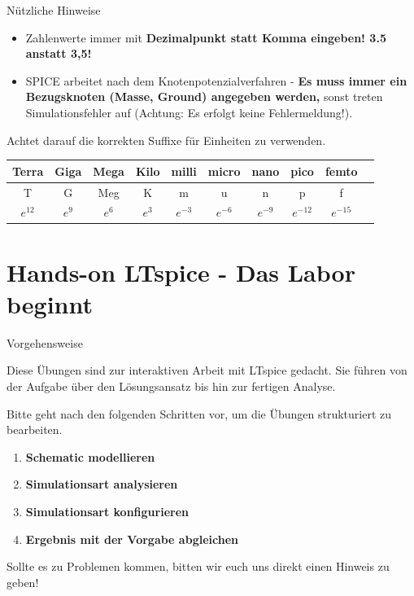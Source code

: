 \documentclass{beamer}
\begin{document}
\begin{frame}[t]{Nützliche Hinweise}

  \begin{itemize}
    \item Zahlenwerte immer mit \textbf{Dezimalpunkt statt Komma eingeben! 3.5 anstatt 3,5!}
    \item SPICE arbeitet nach dem Knotenpotenzialverfahren - \textbf{Es muss immer ein Bezugsknoten
            (Masse, Ground) angegeben werden,} sonst treten Simulationsfehler auf (Achtung: Es erfolgt
          keine Fehlermeldung!).
  \end{itemize}
  Achtet darauf die korrekten Suffixe für Einheiten zu verwenden.

  \begin{tabular}{| c | c | c | c | c | c | c | c | c | c |}
    \hline
    Terra    & Giga    & Mega    & Kilo    & milli    & micro    & nano     & pico      & femto     \\
    \hline
    T        & G       & Meg     & K       & m        & u        & n        & p         & f         \\
    \hline
    $e^{12}$ & $e^{9}$ & $e^{6}$ & $e^{3}$ & $e^{-3}$ & $e^{-6}$ & $e^{-9}$ & $e^{-12}$ & $e^{-15}$ \\
    \hline
  \end{tabular}
\end{frame}

\section{Hands-on LTspice - Das Labor beginnt}


\begin{frame}[fragile]{Vorgehensweise}

  Diese Übungen sind zur interaktiven Arbeit mit LTspice gedacht.
  Sie führen von der Aufgabe über den Lösungsansatz bis hin zur fertigen Analyse.

  Bitte geht nach den folgenden Schritten vor, um die Übungen strukturiert zu bearbeiten.

  \begin{enumerate}
    \item \textbf{Schematic modellieren}
    \item \textbf{Simulationsart analysieren}
    \item \textbf{Simulationsart konfigurieren}
    \item \textbf{Ergebnis mit der Vorgabe abgleichen}
  \end{enumerate}

  Sollte es zu Problemen kommen, bitten wir euch uns direkt einen Hinweis zu geben!

\end{frame}
\end{document}

